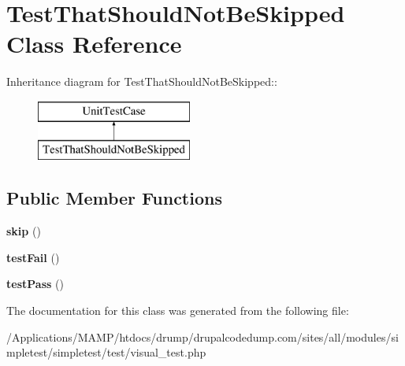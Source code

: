 \hypertarget{class_test_that_should_not_be_skipped}{
\section{TestThatShouldNotBeSkipped Class Reference}
\label{class_test_that_should_not_be_skipped}
}
Inheritance diagram for TestThatShouldNotBeSkipped::\begin{figure}[H]
\begin{center}
\leavevmode
\includegraphics[height=2cm]{class_test_that_should_not_be_skipped}
\end{center}
\end{figure}
\subsection*{Public Member Functions}
\begin{DoxyCompactItemize}
\item 
\hypertarget{class_test_that_should_not_be_skipped_a96c4acf25790082324d174bd028ee42a}{
{\bfseries skip} ()}
\label{class_test_that_should_not_be_skipped_a96c4acf25790082324d174bd028ee42a}

\item 
\hypertarget{class_test_that_should_not_be_skipped_a85abee55781c4effab357481079eef3c}{
{\bfseries testFail} ()}
\label{class_test_that_should_not_be_skipped_a85abee55781c4effab357481079eef3c}

\item 
\hypertarget{class_test_that_should_not_be_skipped_a114328f087ff5c7349f089606fafa23d}{
{\bfseries testPass} ()}
\label{class_test_that_should_not_be_skipped_a114328f087ff5c7349f089606fafa23d}

\end{DoxyCompactItemize}


The documentation for this class was generated from the following file:\begin{DoxyCompactItemize}
\item 
/Applications/MAMP/htdocs/drump/drupalcodedump.com/sites/all/modules/simpletest/simpletest/test/visual\_\-test.php\end{DoxyCompactItemize}
